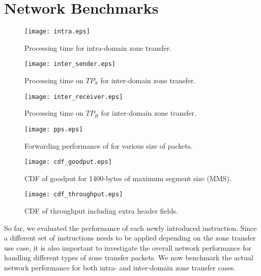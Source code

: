\section{Network Benchmarks}
\label{sec:networkbenchmark}

\begin{figure}[htb]
	\begin{minipage}{.47\linewidth}
		\centering
		\texttt{[image: intra.eps]}
		\caption{Processing time for intra-domain zone transfer. }
		\label{fig:intra}
	\end{minipage}\hspace{1em}
	\begin{minipage}{.47\linewidth}
		\centering
		\texttt{[image: inter\_sender.eps]}
		\caption{Processing time on $TP_S$ for inter-domain zone transfer.}
		\label{fig:inter_sender}
	\end{minipage}\vspace{2em}
	\begin{minipage}{.47\linewidth}
		\centering
		\texttt{[image: inter\_receiver.eps]}
		\caption{Processing time on $TP_R$ for inter-domain zone transfer.}
		\label{fig:inter_receiver}
	\end{minipage}\hspace{1em}
	\begin{minipage}{.47\linewidth}
		\centering
		\texttt{[image: pps.eps]}
		\caption{Forwarding performance of \tp for various size of packets.}
		\label{fig:forwarding}
	\end{minipage}\vspace{2em}
	\begin{minipage}{.47\linewidth}
		\centering
		\texttt{[image: cdf\_goodput.eps]}
		\caption{CDF of goodput for 1400-bytes of maximum segment size (MMS).}
		\label{fig:goodput}
	\end{minipage}\hspace{1em}
	\begin{minipage}{.47\linewidth}
		\centering
		\texttt{[image: cdf\_throughput.eps]}
		\caption{CDF of throughput including extra header fields.}
		\label{fig:throughput}
	\end{minipage}
\end{figure}

So far, we evaluated the performance of each newly introduced instruction. Since a different
set of instructions needs to be applied depending on the zone transfer use case, it is also
important to investigate the overall network performance for handling different types of zone
transfer packets. We now benchmark the actual network performance for both intra- and inter-domain
zone transfer cases.

